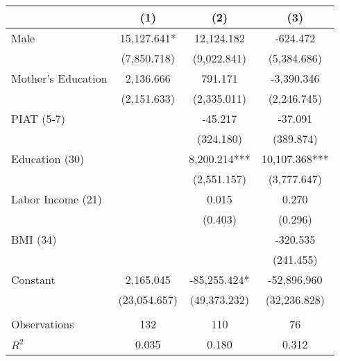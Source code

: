 \begin{tabular}{lccc} \toprule
 & (1) & (2) & (3) \\ \midrule
Male & 15,127.641* & 12,124.182 & -624.472 \\
 & (7,850.718) & (9,022.841) & (5,384.686) \\
Mother's Education & 2,136.666 & 791.171 & -3,390.346 \\
 & (2,151.633) & (2,335.011) & (2,246.745) \\
PIAT (5-7) &  & -45.217 & -37.091 \\
 &  & (324.180) & (389.874) \\
Education (30) &  & 8,200.214*** & 10,107.368*** \\
 &  & (2,551.157) & (3,777.647) \\
Labor Income (21) &  & 0.015 & 0.270 \\
 &  & (0.403) & (0.296) \\
BMI (34) &  &  & -320.535 \\
 &  &  & (241.455) \\
Constant & 2,165.045 & -85,255.424* & -52,896.960 \\
 & (23,054.657) & (49,373.232) & (32,236.828) \\ \\ \midrule
Observations & 132 & 110 & 76 \\
$R^2$ & 0.035 & 0.180 & 0.312 \\ \bottomrule
\end{tabular}
